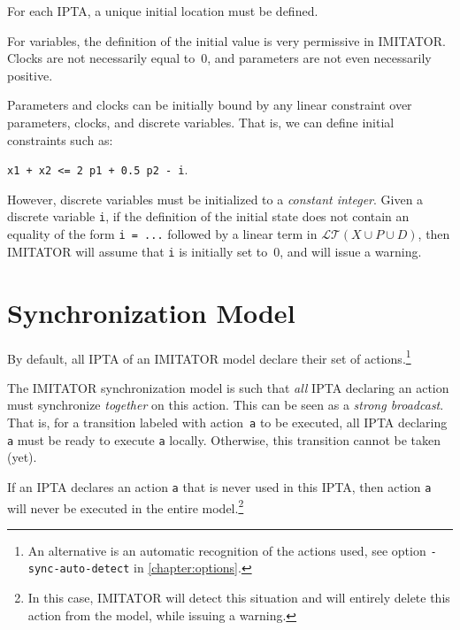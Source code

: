 \documentclass[a4paper,11pt]{report}
\newcommand{\Clock}{X} %
\newcommand{\DVar}{D} %
\newcommand{\LTerm}{\mathcal{LT}} %
\newcommand{\LTermXPD}{\LTerm(\Clock \cup \Param \cup \DVar)}
\newcommand{\Param}{P} %
\newcommand{\imitator}{\textsf{IMITATOR}}
\newcommand{\IPTA}{IPTA}
\newcommand{\styleIMI}[1]{\textcolor{imicolor}{\texttt{#1}}}
\newcommand{\styleOption}[1]{\textcolor{optioncolor}{\texttt{#1}}}
\begin{document}
For each \IPTA{}, a unique initial location must be defined.

For variables, the definition of the initial value is very permissive in \imitator{}.
Clocks are not necessarily equal to~0, and parameters are not even necessarily positive.

Parameters and clocks can be initially bound by any linear constraint over parameters, clocks, and discrete variables.
That is, we can define initial constraints such as:
\begin{center}
	\styleIMI{x1 + x2 <= 2 p1 + 0.5 p2 - i}.
\end{center}

However, discrete variables must be initialized to a \emph{constant integer}.
Given a discrete variable \styleIMI{i}, if the definition of the initial state does not contain an equality of the form \styleIMI{i = ...} followed by a linear term in $\LTermXPD$, then \imitator{} will assume that \styleIMI{i} is initially set to~0, and will issue a warning.



\section{Synchronization Model}

By default, all \IPTA{} of an \imitator{} model declare their set of actions.\footnote{%
	An alternative is an automatic recognition of the actions used, see option \styleOption{-sync-auto-detect} in \cref{chapter:options}.
}

The \imitator{} synchronization model is such that \emph{all} \IPTA{} declaring an action must synchronize \emph{together} on this action.
This can be seen as a \emph{strong broadcast}.
That is, for a transition labeled with action~\styleIMI{a} to be executed, all \IPTA{} declaring \styleIMI{a} must be ready to execute \styleIMI{a} locally.
Otherwise, this transition cannot be taken (yet).

If an \IPTA{} declares an action \styleIMI{a} that is never used in this \IPTA{}, then action \styleIMI{a} will never be executed in the entire model.\footnote{%
	In this case, \imitator{} will detect this situation and will entirely delete this action from the model, while issuing a warning.
}

\end{document}
